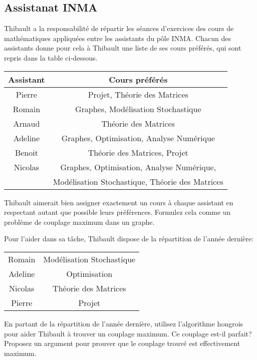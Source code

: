 \subsection{Assistanat INMA}
Thibault a la responsabilité de répartir les séances d'exercices des cours de mathématiques appliquées entre les assistants du pôle INMA. Chacun des assistants donne pour cela à Thibault une liste de ses cours préférés, qui sont repris dans la table ci-dessous.

\begin{center}
  \begin{tabular}{|c|c|}
    \hline
    Assistant & Cours préférés \\
    \hline
    Pierre & Projet, Théorie des Matrices \\
    Romain & Graphes, Modélisation Stochastique \\
    Arnaud & Théorie des Matrices \\
    Adeline & Graphes, Optimisation, Analyse Numérique \\
    Benoit & Théorie des Matrices, Projet \\
    Nicolas & Graphes, Optimisation, Analyse Numérique, \\
            & Modélisation Stochastique, Théorie des Matrices  \\
    \hline
  \end{tabular}
\end{center}

Thibault aimerait bien assigner exactement un cours à chaque assistant en respectant autant que possible leurs préférences. Formulez cela comme un problème de couplage maximum dans un graphe.

Pour l'aider dans sa tâche, Thibault dispose de la répartition de l'année dernière:

\begin{center}
  \begin{tabular}{|c|c|}
    \hline
    Romain & Modélisation Stochastique \\
    Adeline & Optimisation \\
    Nicolas & Théorie des Matrices \\
    Pierre & Projet \\
    \hline
  \end{tabular}
\end{center}

En partant de la répartition de l'année dernière, utilisez l'algorithme hongrois pour aider Thibault à trouver un couplage maximum. Ce couplage est-il parfait? Proposez un argument pour prouver que le couplage trouvé est effectivement maximum.




